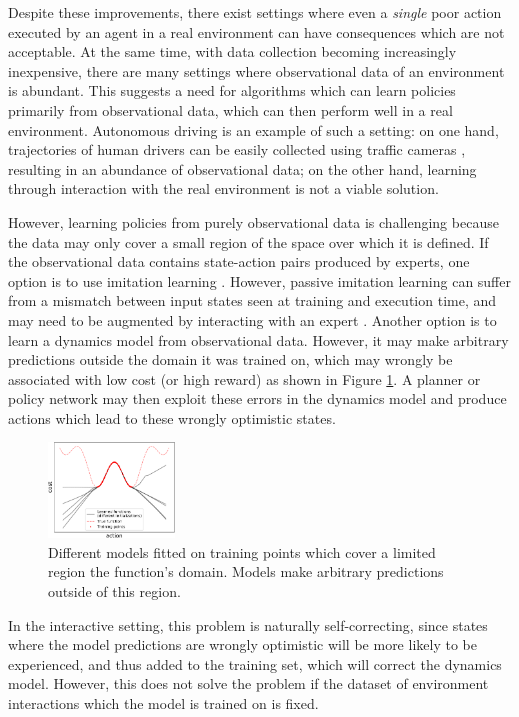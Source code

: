 \documentclass{article} %
\begin{document}
Despite these improvements, there exist settings where even a \textit{single} poor action executed by an agent in a real environment can have consequences which are not acceptable.
At the same time, with data collection becoming increasingly inexpensive, there are many settings where observational data of an environment is abundant.
This suggests a need for algorithms which can learn policies primarily from observational data, which can then perform well in a real environment.
Autonomous driving is an example of such a setting: on one hand, trajectories of human drivers can be easily collected using traffic cameras \citep{NGSIM}, resulting in an abundance of observational data; on the other hand, learning through interaction with the real environment is not a viable solution.


However, learning policies from purely observational data is challenging because the data may only cover a small region of the space over which it is defined. If the observational data contains state-action pairs produced by experts, one option is to use imitation learning \citep{Pomerleau91}.
However, passive imitation learning can suffer from a mismatch between input states seen at training and execution time, and may need to be augmented by interacting with an expert \citep{Dagger}.
Another option is to learn a dynamics model from observational data. However, it may make arbitrary predictions outside the domain it was trained on, which may wrongly be associated with low cost (or high reward) as shown in Figure \ref{simple-example}. A planner or policy network may then exploit these errors in the dynamics model and produce actions which lead to these wrongly optimistic states.
\begin{figure}
  \includegraphics[width=0.3\textwidth]{figures/driving/uncertainty_example2-crop.pdf}
  \caption{\label{simple-example}Different models fitted on training points which cover a limited region the function's domain. Models make arbitrary predictions outside of this region.}
\end{figure}
In the interactive setting, this problem is naturally self-correcting, since states where the model predictions are wrongly optimistic will be more likely to be experienced, and thus added to the training set, which will correct the dynamics model. However, this does not solve the problem if the dataset of environment interactions which the model is trained on is fixed.
\end{document}
